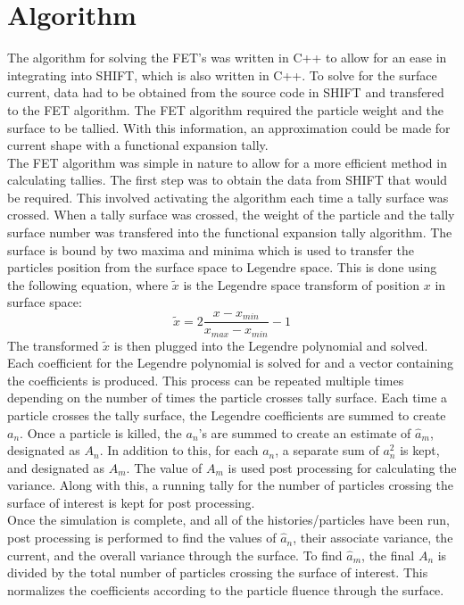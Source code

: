 \documentclass[10tma4paper]{article}
\begin{document}
\section{Algorithm}\label{algorith}
The algorithm for solving the FET's was written in C++ to allow for an ease in integrating into SHIFT, which is also written in C++. To solve for the surface current, data had to be obtained from the source code in SHIFT and transfered to the FET algorithm. The FET algorithm required the particle weight and the surface to be tallied. With this information, an approximation could be made for current shape with a functional expansion tally.
\\
The FET algorithm was simple in nature to allow for a more efficient method in calculating tallies. The first step was to obtain the data from SHIFT that would be required. This involved activating the algorithm each time a tally surface was crossed. When a tally surface was crossed, the weight of the particle and the tally surface number was transfered into the functional expansion tally algorithm. The surface is bound by two maxima and minima which is used to transfer the particles position from the surface space to Legendre space. This is done using the following equation, where $\tilde{x}$ is the Legendre space transform of position $x$ in surface space:
\begin{equation} \label{eq:legendre transform}
\tilde{x} = 2 \frac{x-x_{min}}{x_{max}-x_{min}} - 1
\end{equation}
The transformed $\tilde{x}$ is then plugged into the Legendre polynomial and solved. Each coefficient for the Legendre polynomial is solved for and a vector containing the coefficients is produced. This process can be repeated multiple times depending on the number of times the particle crosses tally surface. Each time a particle crosses the tally surface, the Legendre coefficients are summed to create $a_{n}$. Once a particle is killed, the $a_{n}$'s are summed to create an estimate of $\hat{a}_{m}$, designated as $A_{n}$. In addition to this, for each $a_{n}$, a separate sum of $a_{n}^{2}$ is kept, and designated as $A_{m}$. The value of $A_{m}$ is used post processing for calculating the variance. Along with this, a running tally for the number of particles crossing the surface of interest is kept for post processing.
\\
Once the simulation is complete, and all of the histories/particles have been run, post processing  is performed to find the values of $\hat{a}_{n}$, their associate variance, the current, and the overall variance through the surface. To find $\hat{a}_{m}$, the final $A_{n}$ is divided by the total number of particles crossing the surface of interest. This normalizes the coefficients according to the particle fluence through the surface. \\
\end{document}
